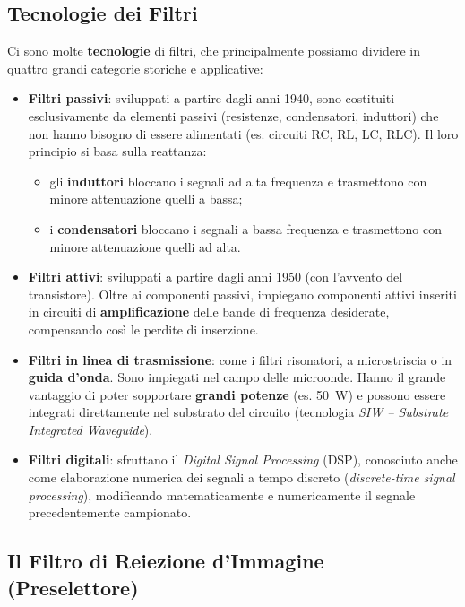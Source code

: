 \documentclass[openany,a4paper,12pt]{book}
\begin{document}
\subsection*{Tecnologie dei Filtri}

Ci sono molte \textbf{tecnologie} di filtri, che principalmente possiamo dividere in quattro grandi categorie storiche e applicative:

\begin{itemize}[label=\textcolor{PoliBlue}{\textbullet}]
    \item \textbf{Filtri passivi}: sviluppati a partire dagli anni 1940, sono costituiti esclusivamente da elementi passivi (resistenze, condensatori, induttori) che non hanno bisogno di essere alimentati (es. circuiti RC, RL, LC, RLC). Il loro principio si basa sulla reattanza:
    \begin{itemize}[label=\textcolor{ForestGreen}{$\circ$}]
        \item gli \textbf{induttori} bloccano i segnali ad alta frequenza e trasmettono con minore attenuazione quelli a bassa;
        \item i \textbf{condensatori} bloccano i segnali a bassa frequenza e trasmettono con minore attenuazione quelli ad alta.
    \end{itemize}
    \item \textbf{Filtri attivi}: sviluppati a partire dagli anni 1950 (con l'avvento del transistore). Oltre ai componenti passivi, impiegano componenti attivi inseriti in circuiti di \textbf{amplificazione} delle bande di frequenza desiderate, compensando così le perdite di inserzione.
    \item \textbf{Filtri in linea di trasmissione}: come i filtri risonatori, a microstriscia o in \textbf{guida d'onda}. Sono impiegati nel campo delle microonde. Hanno il grande vantaggio di poter sopportare \textbf{grandi potenze} (es. \qty{50}{\watt}) e possono essere integrati direttamente nel substrato del circuito (tecnologia \textit{SIW -- Substrate Integrated Waveguide}).
    \item \textbf{Filtri digitali}: sfruttano il \textit{Digital Signal Processing} (DSP), conosciuto anche come elaborazione numerica dei segnali a tempo discreto (\textit{discrete-time signal processing}), modificando matematicamente e numericamente il segnale precedentemente campionato.
\end{itemize}




\subsection*{Il Filtro di Reiezione d'Immagine (Preselettore)}
\end{document}

